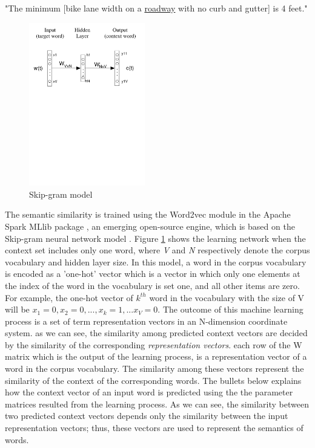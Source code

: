 \documentclass[Journal,InsideFigs, DoubleSpace]{ascelike} %
\begin{document}
%
\begin{center}
	"The minimum [bike lane width on a \underline{roadway} with no curb and gutter] is 4 feet."
\end{center}
%
%
\begin{figure}[t]
	\centering
	\includegraphics[width=0.45\textwidth]{Figure4_skip-gram-model}
	\caption{Skip-gram model}
	\label{fig:skip-gram}
\end{figure}
%
The semantic similarity is trained using the Word2vec module in the Apache Spark MLlib package \cite{apache16}, an emerging open-source engine, which is based on the Skip-gram neural network model \cite{mikolov13a}. Figure \ref{fig:skip-gram} shows the learning network when the context set includes only one word, where \textit{V} and \textit{N} respectively denote the corpus vocabulary and hidden layer size. In this model, a word in the corpus vocabulary is encoded as a 'one-hot' vector which is a vector in which only one elements at the index of the word in the vocabulary is set one, and all other items are zero. For example, the one-hot vector of $k^{th}$ word in the vocabulary with the size of V will be ${x_1=0, x_2=0, ...,x_k=1,...x_V=0}$. The outcome of this machine learning process is a set of term representation vectors  in an N-dimension coordinate system. as we can see, the similarity among predicted context vectors are decided by the similarity of the corresponding \textit{representation vectors}. each row of the W matrix which is the output of the learning process, is a representation vector of a word in the corpus vocabulary. The similarity among these vectors represent the similarity of the context of the corresponding words. The bullets below explains how the context vector of an input word is predicted using the the parameter matrices resulted from the learning process. As we can see, the similarity between two predicted context vectors depends only the similarity between the input representation vectors; thus, these vectors are used to represent the semantics of  words. 
\end{document}
